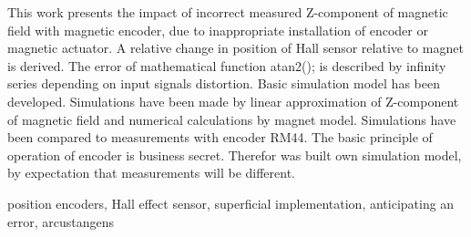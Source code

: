 \documentclass[a4paper,twoside,openright,12pt]{book}
\begin{document}
This work presents the impact of incorrect measured Z-component of magnetic field with magnetic encoder, due to inappropriate installation of encoder or magnetic actuator.
A relative change in position of Hall sensor relative to magnet is derived.
The error of mathematical function atan2(); is described by infinity series depending on input signals distortion.
Basic simulation model has been developed.
Simulations have been made by linear approximation of Z-component of magnetic field and numerical calculations by magnet model.
Simulations have been compared to measurements with encoder RM44.
The basic principle of  operation of encoder is business secret.
Therefor was built own simulation model, by expectation that measurements will be different.

\keywords position encoders, Hall effect sensor, superficial implementation, anticipating an error, arcustangens



%
%
%
%


\end{document}
